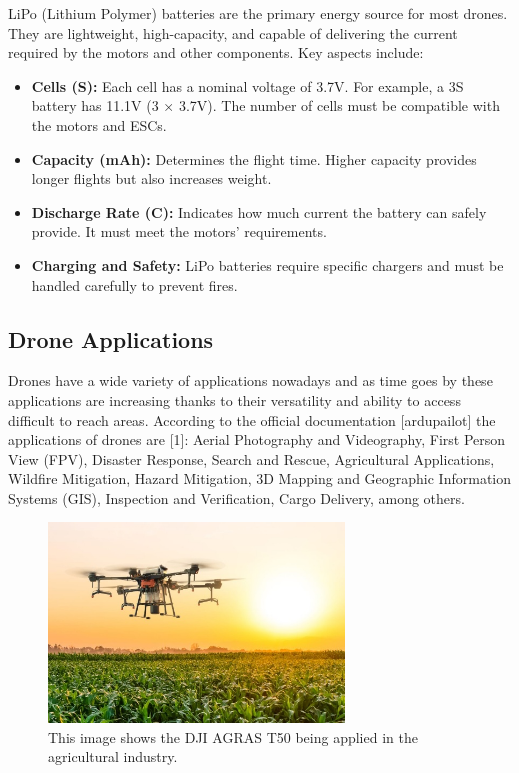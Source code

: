 LiPo (Lithium Polymer) batteries are the primary energy source for most drones. They are lightweight, high-capacity, and capable of delivering the current required by the motors and other components. Key aspects include:

\begin{itemize}
    \item \textbf{Cells (S):} Each cell has a nominal voltage of 3.7V. For example, a 3S battery has 11.1V (3 × 3.7V). The number of cells must be compatible with the motors and ESCs.
    \item \textbf{Capacity (mAh):} Determines the flight time. Higher capacity provides longer flights but also increases weight.
    \item \textbf{Discharge Rate (C):} Indicates how much current the battery can safely provide. It must meet the motors' requirements.
    \item \textbf{Charging and Safety:} LiPo batteries require specific chargers and must be handled carefully to prevent fires.
\end{itemize}

\subsection{Drone Applications}
Drones have a wide variety of applications nowadays and as time goes by these applications are increasing thanks to their versatility and ability to access difficult to reach areas. According to the official documentation [ardupailot] the applications of drones are [1]: Aerial Photography and Videography, First Person View (FPV), Disaster Response, Search and Rescue, Agricultural Applications, Wildfire Mitigation, Hazard Mitigation, 3D Mapping and Geographic Information Systems (GIS), Inspection and Verification, Cargo Delivery, among others.

\begin{figure}
    \centering
    \includegraphics[width=0.7\textwidth]{pictures/drone_aplication_1.jpg}
    \caption{This image shows the DJI AGRAS T50 being applied in the agricultural industry.  \cite{aplications_drones} }
    \label{fig:drone_applications}
\end{figure}


